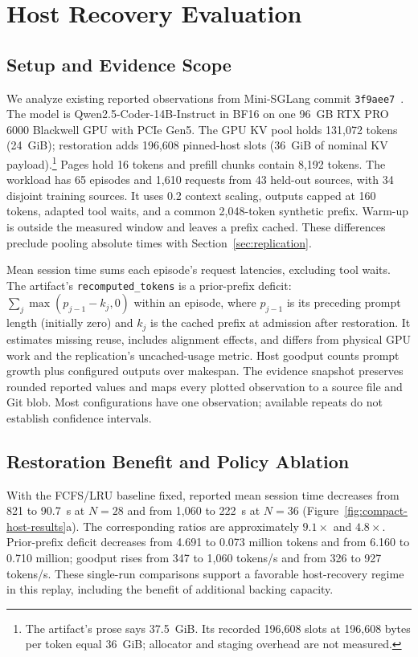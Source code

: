 \section{Host Recovery Evaluation}
\label{sec:evaluation}


\subsection{Setup and Evidence Scope}
We analyze existing reported observations from Mini-SGLang commit \texttt{3f9aee7}~\cite{MiniSGLang2026Artifact}.
The model is Qwen2.5-Coder-14B-Instruct in BF16 on one 96~GB RTX PRO 6000 Blackwell GPU with PCIe Gen5.
The GPU KV pool holds 131,072 tokens (24~GiB); restoration adds 196,608 pinned-host slots (36~GiB of nominal KV payload).\footnote{The artifact's prose says 37.5~GiB. Its recorded 196,608 slots at 196,608 bytes per token equal 36~GiB; allocator and staging overhead are not measured.}
Pages hold 16 tokens and prefill chunks contain 8,192 tokens.
The workload has 65 episodes and 1,610 requests from 43 held-out sources, with 34 disjoint training sources.
It uses 0.2 context scaling, outputs capped at 160 tokens, adapted tool waits, and a common 2,048-token synthetic prefix.
Warm-up is outside the measured window and leaves a prefix cached.
These differences preclude pooling absolute times with Section~\ref{sec:replication}.

Mean session time sums each episode's request latencies, excluding tool waits.
The artifact's \texttt{recomputed\_tokens} is a prior-prefix deficit: $\sum_j\max(p_{j-1}-k_j,0)$ within an episode, where $p_{j-1}$ is its preceding prompt length (initially zero) and $k_j$ is the cached prefix at admission after restoration.
It estimates missing reuse, includes alignment effects, and differs from physical GPU work and the replication's uncached-usage metric.
Host goodput counts prompt growth plus configured outputs over makespan.
The evidence snapshot preserves rounded reported values and maps every plotted observation to a source file and Git blob.
Most configurations have one observation; available repeats do not establish confidence intervals.

\subsection{Restoration Benefit and Policy Ablation}
With the FCFS/LRU baseline fixed, reported mean session time decreases from 821 to 90.7~s at $N=28$ and from 1,060 to 222~s at $N=36$ (Figure~\ref{fig:compact-host-results}a).
The corresponding ratios are approximately $9.1\times$ and $4.8\times$.
Prior-prefix deficit decreases from 4.691 to 0.073 million tokens and from 6.160 to 0.710 million; goodput rises from 347 to 1,060 tokens/s and from 326 to 927 tokens/s.
These single-run comparisons support a favorable host-recovery regime in this replay, including the benefit of additional backing capacity.

